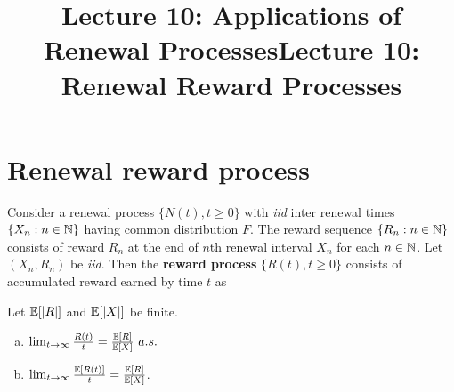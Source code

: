 \documentclass[a4paper,10pt,english]{article}
\title{Lecture 10: Applications of Renewal Processes}
\title{Lecture 10: Renewal Reward Processes}
\author{}
\begin{document}
\maketitle
\section{Renewal reward process}
Consider a renewal process $\{N(t), t \geq 0\}$ with \textit{iid} inter renewal times $\{X_n: n \in \mathbb{N}\}$ having common distribution $F$.  
The reward sequence $\{R_n: n \in \mathbb{N}\}$ consists of reward $R_n$ at the end of $n$th renewal interval $X_n$ for each $n \in \mathbb{N}$. 
Let $(X_n,R_n)$ be \textit{iid}. 
Then the \textbf{reward process} $\{R(t), t \geqslant 0\}$ consists of accumulated reward earned by time $t$ as 
\begin{thm}
	\label{theorem}
Let $\mathbb{E}[|R|]$ and $\mathbb{E}[|X|]$ be finite.
\begin{enumerate}[(a)]
\item\label{item:Basic} $\lim_{t \to \infty} \frac{R(t)}{t} = \frac{\mathbb{E}[R]}{\mathbb{E}[X]} ~a.s.$
\item\label{item:Elem}  $\lim_{t \to \infty} \frac{\mathbb{E}[R(t)]}{t} = \frac{\mathbb{E}[R]}{\mathbb{E}[X]}$.
\end{enumerate}
\end{thm}
\end{document}
